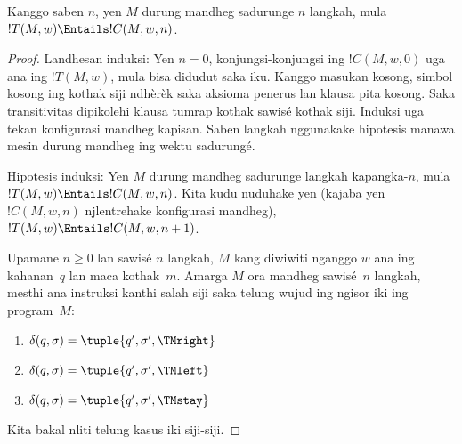\documentclass[../../../include/open-logic-section]{subfiles}
\begin{document}
\begin{lem}
Kanggo saben $n$, yen $M$ durung
mandheg sadurunge $n$ langkah, mula
$!T(M, w) \Entails !C(M, w, n)$.
\end{lem}

\begin{proof}
Landhesan induksi: Yen $n = 0$, konjungsi-konjungsi
ing $!C(M, w, 0)$ uga ana ing $!T(M, w)$,
mula bisa didudut saka iku. Kanggo masukan kosong, simbol kosong ing kothak siji ndhèrèk saka aksioma penerus lan klausa pita kosong. Saka transitivitas dipikolehi klausa tumrap kothak sawisé kothak siji. Induksi uga tekan konfigurasi mandheg kapisan. Saben langkah nggunakake hipotesis manawa mesin durung mandheg ing wektu sadurungé.

Hipotesis induksi: Yen $M$ durung mandheg
sadurunge langkah kapangka-$n$, mula
$!T(M,w) \Entails !C(M, w, n)$.
Kita kudu nuduhake yen (kajaba yen
$!C(M, w, n)$ njlentrehake konfigurasi
mandheg), $!T(M, w) \Entails
!C(M, w, n+1)$.

Upamane $n \ge 0$ lan sawisé $n$ langkah,
$M$ kang diwiwiti nganggo $w$ ana ing
kahanan~$q$ lan maca kothak~$m$.
Amarga $M$ ora mandheg sawisé~$n$
langkah, mesthi ana instruksi kanthi
salah siji saka telung wujud ing ngisor
iki ing program~$M$:

\begin{enumerate} 
\item {} $\delta(q, \sigma) = \tuple{q', \sigma', \TMright}$

\item {} $\delta(q, \sigma) = \tuple{q', \sigma', \TMleft}$

\item {} $\delta(q, \sigma) = \tuple{q', \sigma', \TMstay}$
\end{enumerate}

Kita bakal nliti telung kasus iki siji-siji.


\end{proof}
\end{document}
